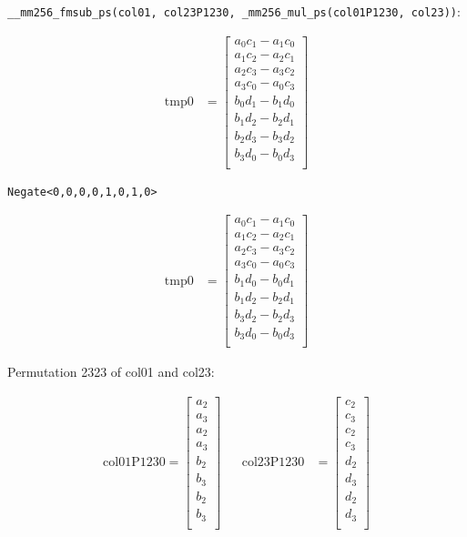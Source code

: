 \documentclass[fontsize = 10pt,DIV = 13]{scrartcl}
\begin{document}
\texttt{__mm256_fmsub_ps(col01, col23P1230, _mm256_mul_ps(col01P1230, col23))}:

\begin{align*}
\mathrm{tmp0} 
&=
\begin{bmatrix}
a_0c_1 - a_1c_0\\
a_1c_2 - a_2c_1\\
a_2c_3 - a_3c_2\\
a_3c_0 - a_0c_3\\
b_0d_1 - b_1d_0\\
b_1d_2 - b_2d_1\\
b_2d_3 - b_3d_2\\
b_3d_0 - b_0d_3\\
\end{bmatrix}
\end{align*}

\texttt{Negate<0,0,0,0,1,0,1,0>} 

\begin{align*}
\mathrm{tmp0} 
&=
\begin{bmatrix}
a_0c_1 - a_1c_0\\
a_1c_2 - a_2c_1\\
a_2c_3 - a_3c_2\\
a_3c_0 - a_0c_3\\
b_1d_0 - b_0d_1\\
b_1d_2 - b_2d_1\\
b_3d_2 - b_2d_3\\
b_3d_0 - b_0d_3\\
\end{bmatrix}
\end{align*}



Permutation 2323 of col01 and col23:

\begin{align*}
\mathrm{col01P1230} 
=
\begin{bmatrix}
a_2\\
a_3\\
a_2\\
a_3\\
b_2\\
b_3\\
b_2\\
b_3\\
\end{bmatrix}
&&
\mathrm{col23P1230} 
&=
\begin{bmatrix}
c_2\\
c_3\\
c_2\\
c_3\\
d_2\\
d_3\\
d_2\\
d_3\\
\end{bmatrix}
\end{align*}
\end{document}
